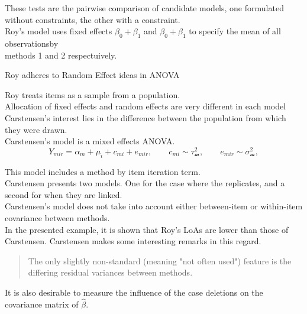 \documentclass[12pt, a4paper]{report}
\theoremstyle{plain}
\theoremstyle{definition}
\theoremstyle{remark}
\begin{document}
These tests are the pairwise comparison of candidate models, one formulated without constraints, the other with a constraint.\\


Roy's model uses fixed effects $\beta_0 + \beta_1$ and $\beta_0 + \beta_1$ to specify the mean of all observationsby \\ methods 1 and 2 respectuively.





Roy adheres to Random Effect ideas in ANOVA

Roy treats items as a sample from a population.\\

Allocation of fixed effects and random effects are very different in each model\\

Carstensen's interest lies in the difference between the population from which they were drawn.\\

Carstensen's model is a mixed effects ANOVA.\\

\[
Y_{mir}  =  \alpha_m + \mu_i + c_{mi} + e_{mir}, \qquad c_{mi} \sim \mathcal{\tau^2_m}, \qquad e_{mir} \sim \mathcal{\sigma^2_m},
\]

This model includes a method by item iteration term.\\

Carstensen presents two models. One for the case where the replicates, and a second for when they are linked.\\

Carstensen's model does not take into account either between-item or within-item covariance between methods.\\


In the presented example, it is shown that Roy's LoAs are lower than those of Carstensen.
Carstensen makes some interesting remarks in this regard.

\begin{quote}
	The only slightly non-standard (meaning "not often used") feature is the differing residual variances between methods.
\end{quote}





It is also desirable to measure the influence of the case deletions on the covariance matrix of $\hat{\beta}$.
\end{document}
